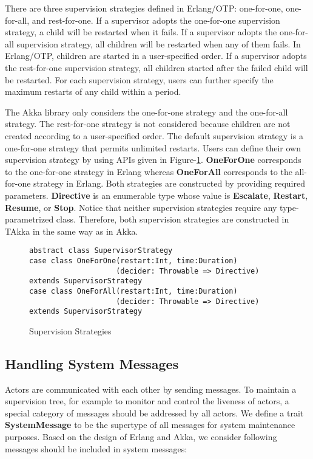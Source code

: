 There are three supervision strategies defined in Erlang/OTP: one-for-one,
one-for-all, and rest-for-one\cite{OTP}.  If a supervisor adopts the one-for-one
supervision strategy, a child will be restarted when it fails.  If a supervisor
adopts the one-for-all supervision strategy, all children will be restarted when
any of them fails.  In Erlang/OTP, children are started in a user-specified
order.  If a supervisor adopts the rest-for-one supervision strategy, all
children started after the failed child will be restarted.  For each
supervision strategy, users can further specify the maximum restarts of any
child within a period.

The Akka library only considers the one-for-one strategy and the one-for-all
strategy.  The rest-for-one strategy is not considered because children are not
created according to a user-specified order.  The default supervision strategy
is a one-for-one strategy that permits unlimited restarts.  Users can define
their own supervision strategy by using APIs given in Figure-\ref{super}.  {\bf
OneForOne} corresponds to the one-for-one strategy in Erlang whereas {\bf
OneForAll} corresponds to the all-for-one strategy in Erlang.  Both
strategies are constructed by providing required parameters.  {\bf Directive} is
an enumerable type whose value is {\bf Escalate}, {\bf Restart}, {\bf Resume},
or {\bf Stop}.  Notice that neither supervision strategies require any type-parametrized class. Therefore, both supervision strategies
are constructed in TAkka in the same way as in Akka.


\begin{figure}[h]
\label{super}
    \begin{lstlisting}    
abstract class SupervisorStrategy
case class OneForOne(restart:Int, time:Duration)
                    (decider: Throwable => Directive) extends SupervisorStrategy
case class OneForAll(restart:Int, time:Duration)
                    (decider: Throwable => Directive) extends SupervisorStrategy
    \end{lstlisting}
    \caption{Supervision Strategies}
\end{figure}


\subsection{Handling System Messages}

Actors are communicated with each other by sending messages.  To maintain a
supervision tree, for example to monitor and control the liveness of actors, a
special category of messages should be addressed by all actors.  We define a
trait {\bf SystemMessage} to be the supertype of all messages for system
maintenance purposes.  Based on the design of Erlang and Akka, we consider
following messages should be included in system messages:

